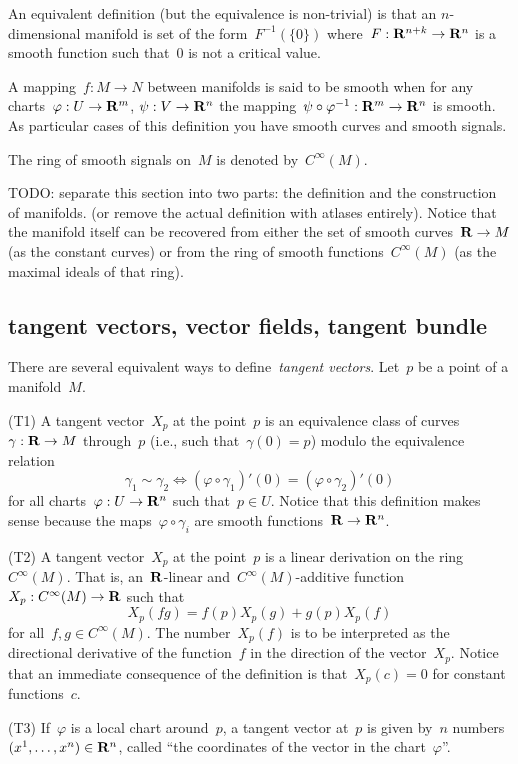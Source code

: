 An equivalent definition (but the equivalence is non-trivial) is that an
$n$-dimensional manifold is set of the form~$F^{-1}(\{0\})$
where~$F:\mathbf{R}^{n+k}\to\mathbf{R}^n$ is a smooth function such that~$0$ is not a
critical value.

A mapping~$f:M\to N$ between manifolds is said to be smooth when for any
charts~$\varphi:U\to\mathbf{R}^m$, $\psi:V\to\mathbf{R}^n$ the
mapping~$\psi\circ\varphi^{-1}:\mathbf{R}^m\to\mathbf{R}^n$ is smooth.
As particular cases  of this definition you have smooth curves and smooth
signals.

The ring of smooth signals on~$M$ is denoted by~$C^\infty(M)$.

TODO: separate this section into two parts: the definition and the
construction of manifolds.  (or remove the actual definition with atlases
entirely).  Notice that the manifold itself can be recovered from either the
set of smooth curves~$\mathbf{R}\to M$ (as the constant curves) or from the ring of
smooth functions~$C^\infty(M)$ (as the maximal ideals of that ring).

\subsection{tangent vectors, vector fields, tangent bundle}

There are several equivalent ways to define~\emph{tangent vectors}.
Let~$p$ be a point of a manifold~$M$.

(T1) A tangent vector~$X_p$ at the point~$p$ is an equivalence class of
curves~$\gamma:\mathbf{R}\to M$ through~$p$ (i.e., such that~$\gamma(0)=p$)
modulo the equivalence relation
\[
	\gamma_1\sim\gamma_2
	\iff
		(\varphi\circ\gamma_1)'(0)=(\varphi\circ\gamma_2)'(0)
\]
for all charts~$\varphi:U\to\mathbf{R}^n$ such that~$p\in U$.  Notice that this
definition makes sense because the maps~$\varphi\circ\gamma_i$ are smooth
functions~$\mathbf{R}\to\mathbf{R}^n$.

(T2) A tangent vector~$X_p$ at the point~$p$ is a linear derivation on the
ring~$C^\infty(M)$.  That is, an~$\mathbf{R}$-linear and~$C^\infty(M)$-additive
function~$X_p:C^\infty(M)\to\mathbf{R}$ such that
\[
	X_p(fg)=f(p)X_p(g) + g(p)X_p(f)
\]
for all~$f,g\in C^\infty(M)$.  The number~$X_p(f)$ is to be interpreted as
the directional derivative of the function~$f$ in the direction of the
vector~$X_p$.  Notice that an immediate consequence of the definition is
that~$X_p(c)=0$ for constant functions~$c$.

(T3) If~$\varphi$ is a local chart around~$p$, a tangent vector at~$p$ is
given by~$n$ numbers~$(x^1,\ldots,x^n)\in\mathbf{R}^n$, called ``the coordinates of
the vector in the chart~$\varphi$''.

